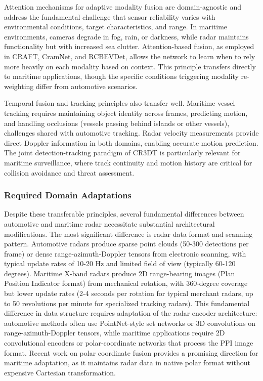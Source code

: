 Attention mechanisms for adaptive modality fusion are domain-agnostic and address the fundamental challenge that sensor reliability varies with environmental conditions, target characteristics, and range. In maritime environments, cameras degrade in fog, rain, or darkness, while radar maintains functionality but with increased sea clutter. Attention-based fusion, as employed in CRAFT, CramNet, and RCBEVDet, allows the network to learn when to rely more heavily on each modality based on context. This principle transfers directly to maritime applications, though the specific conditions triggering modality re-weighting differ from automotive scenarios.

Temporal fusion and tracking principles also transfer well. Maritime vessel tracking requires maintaining object identity across frames, predicting motion, and handling occlusions (vessels passing behind islands or other vessels), challenges shared with automotive tracking. Radar velocity measurements provide direct Doppler information in both domains, enabling accurate motion prediction. The joint detection-tracking paradigm of CR3DT is particularly relevant for maritime surveillance, where track continuity and motion history are critical for collision avoidance and threat assessment.

\subsubsection{Required Domain Adaptations}

Despite these transferable principles, several fundamental differences between automotive and maritime radar necessitate substantial architectural modifications. The most significant difference is radar data format and scanning pattern. Automotive radars produce sparse point clouds (50-300 detections per frame) or dense range-azimuth-Doppler tensors from electronic scanning, with typical update rates of 10-20 Hz and limited field of view (typically 60-120 degrees). Maritime X-band radars produce 2D range-bearing images (Plan Position Indicator format) from mechanical rotation, with 360-degree coverage but lower update rates (2-4 seconds per rotation for typical merchant radars, up to 50 revolutions per minute for specialized tracking radars). This fundamental difference in data structure requires adaptation of the radar encoder architecture: automotive methods often use PointNet-style set networks or 3D convolutions on range-azimuth-Doppler tensors, while maritime applications require 2D convolutional encoders or polar-coordinate networks that process the PPI image format. Recent work on polar coordinate fusion \cite{Kim2022CRAFT} provides a promising direction for maritime adaptation, as it maintains radar data in native polar format without expensive Cartesian transformation.

